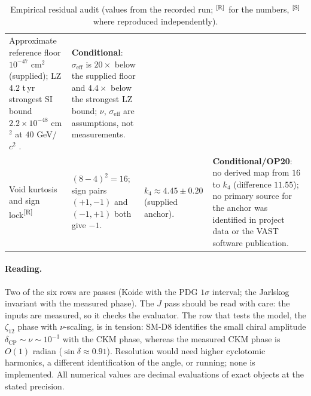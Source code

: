 \documentclass[11pt,a4paper]{article}
\theoremstyle{definition}
\theoremstyle{remark}
\newcommand{\tR}{\textsuperscript{[R]}}
\newcommand{\tS}{\textsuperscript{[S]}}
\begin{document}
\begin{table}[!htbp]
\begin{tabularx}{\textwidth}{@{}>{\raggedright\arraybackslash}p{2.6cm}>{\raggedright\arraybackslash}X>{\raggedright\arraybackslash}p{3.4cm}>{\raggedright\arraybackslash}p{2.6cm}@{}}
Approximate reference floor $10^{-47}$ cm$^2$ (supplied); LZ $4.2$ t\,yr strongest SI bound $2.2\times10^{-48}$ cm$^2$ at $40$ GeV/$c^2$ \cite{LZ}. &
\textbf{Conditional}: $\sigma_{\mathrm{eff}}$ is $20\times$ below the supplied floor and $4.4\times$ below the strongest LZ bound; $\nu$, $\sigma_{\mathrm{eff}}$ are assumptions, not measurements.\\
Void kurtosis and sign lock\tR &
$(8-4)^2=16$; sign pairs $(+1,-1)$ and $(-1,+1)$ both give $-1$. &
$k_4\approx4.45\pm0.20$ (supplied anchor). &
\textbf{Conditional/OP20}: no derived map from $16$ to $k_4$ (difference $11.55$); no primary source for the anchor was identified in project data or the VAST software publication.\\
\bottomrule
\end{tabularx}
\caption{Empirical residual audit (values from the recorded run; $\tR$ for the numbers, $\tS$ where reproduced independently).}\label{tab:resid}
\end{table}

\paragraph{Reading.} Two of the six rows are passes (Koide with the PDG $1\sigma$ interval; the Jarlskog invariant with the measured phase). The $J$ pass should be read with care: the inputs are measured, so it checks the evaluator. The row that tests the model, the $\zeta_{12}$ phase with $\nu$-scaling, is in tension: SM-D8 identifies the small chiral amplitude $\delta_{\mathrm{CP}}\sim\nu\sim10^{-3}$ with the CKM phase, whereas the measured CKM phase is $O(1)$ radian ($\sin\delta\approx0.91$). Resolution would need higher cyclotomic harmonics, a different identification of the angle, or running; none is implemented. All numerical values are decimal evaluations of exact objects at the stated precision.
\end{document}
